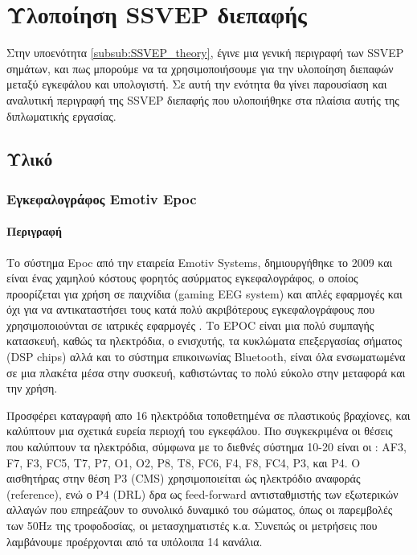 \documentclass[11pt,a4paper,english,greek,twoside]{../Thesis}
\begin{document}
\chapter{Υλοποίηση SSVEP διεπαφής} \label{chap:SSVEP_implementation}
Στην υποενότητα \ref{subsub:SSVEP_theory}, έγινε μια γενική περιγραφή των SSVEP σημάτων, και πως μπορούμε να τα χρησιμοποιήσουμε για την υλοποίηση διεπαφών μεταξύ εγκεφάλου και υπολογιστή. Σε αυτή την ενότητα θα γίνει παρουσίαση και αναλυτική περιγραφή της SSVEP διεπαφής που υλοποιήθηκε στα πλαίσια αυτής της διπλωματικής εργασίας.

\section{Υλικό}
\subsection{Εγκεφαλογράφος Emotiv Epoc}
\subsubsection{Περιγραφή}
\par Το σύστημα  Epoc από την εταιρεία Emotiv Systems, δημιουργήθηκε το 2009 και είναι ένας χαμηλού κόστους φορητός ασύρματος εγκεφαλογράφος, ο οποίος προορίζεται για χρήση σε παιχνίδια (gaming EEG system) και απλές εφαρμογές και όχι για να αντικαταστήσει τους κατά πολύ ακριβότερους εγκεφαλογράφους που χρησιμοποιούνται σε ιατρικές εφαρμογές . Το EPOC είναι μια πολύ συμπαγής κατασκευή, καθώς τα ηλεκτρόδια, ο ενισχυτής, τα κυκλώματα επεξεργασίας σήματος (DSP chips) αλλά και το σύστημα επικοινωνίας Bluetooth, είναι όλα ενσωματωμένα σε μια πλακέτα μέσα στην συσκευή, καθιστώντας το πολύ εύκολο στην μεταφορά και την χρήση. 
\par Προσφέρει καταγραφή απο 16 ηλεκτρόδια τοποθετημένα σε πλαστικούς βραχίονες, και  καλύπτουν μια σχετικά ευρεία περιοχή του εγκεφάλου. Πιο συγκεκριμένα οι θέσεις που καλύπτουν τα ηλεκτρόδια, σύμφωνα με το διεθνές σύστημα 10-20 είναι οι : AF3, F7, F3, FC5, T7, P7, O1, O2, P8, T8, FC6, F4, F8, FC4, P3, και P4. Ο αισθητήρας στην θέση P3 (CMS) χρησιμοποιείται ώς ηλεκτρόδιο αναφοράς (reference), ενώ ο P4 (DRL) δρα ως feed-forward αντισταθμιστής των εξωτερικών αλλαγών που επηρεάζουν το συνολικό δυναμικό του σώματος, όπως οι παρεμβολές των 50Hz της τροφοδοσίας, οι μετασχηματιστές κ.α. Συνεπώς οι μετρήσεις που λαμβάνουμε προέρχονται από τα υπόλοιπα 14 κανάλια.
\end{document}
